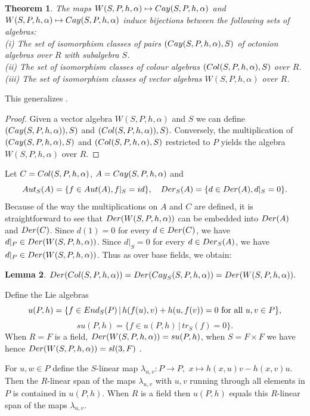 \documentclass[10pt]{amsart}
\theoremstyle{plain}
\newtheorem{theorem}{Theorem}[section]
\newtheorem{lemma}[theorem]{Lemma}
\theoremstyle{definition}
\begin{document}
\begin{theorem}
The maps $W(S, P, h,\alpha)\mapsto {\rm Cay}(S, P, h,\alpha)$ and $W(S, P, h,\alpha)\mapsto {\rm Cay}(S, P, h,\alpha)$ induce bijections between the following sets of algebras:
\\ (i) The set of isomorphism classes of pairs $({\rm Cay}(S, P, h,\alpha), S)$ of octonion algebras over $R$ with subalgebra $S$.
\\ (ii)  The set of isomorphism classes of colour algebras $({\rm Col}(S, P, h,\alpha), S)$ over $R$.
\\ (iii)  The set of isomorphism classes  of vector algebras $W(S, P, h,\alpha)$ over $R$.
\end{theorem}

This generalizes \cite[Theorem 3.1]{EM}.

\begin{proof}
Given a vector algebra $W(S, P, h,\alpha)$ and $S$ we can define $({\rm Cay}(S, P, h,\alpha)), S)$ and $({\rm Col}(S, P, h,\alpha)), S)$.
Conversely, the multiplication of  $({\rm Cay}(S, P, h,\alpha), S)$ and $({\rm Col}(S, P, h,\alpha), S)$ restricted to $P$ yields the algebra
$W(S, P, h,\alpha)$ over $R$.
\end{proof}


Let $C={\rm Col}(S, P,h,\alpha)$, $A={\rm Cay}(S, P,h,\alpha)$ and
$${\rm Aut}_S(A)=\{ f\in {\rm Aut}(A), f|_S=id \},\quad {\rm Der}_S(A)=\{  d\in {\rm Der}(A), d|_S=0\}.$$
Because of the way the multiplications on $A$ and $C$ are defined, it is straightforward to see that  ${\rm Der}(W(S, P,h,\alpha))$ can be embedded into  ${\rm Der}(A)$ and  ${\rm Der}(C)$. Since $d(1)=0$ for every $d\in {\rm Der}(C)$, we have $d|_P\in {\rm Der}(W(S, P,h,\alpha))$. Since
 $d|_S=0$ for every $d\in {\rm Der}_S(A)$, we have $d|_P\in {\rm Der}(W(S, P,h,\alpha))$.
 Thus as over base fields, we obtain:

 \begin{lemma}
 ${\rm Der}({\rm Col}(S, P,h,\alpha))={\rm Der}({\rm Cay}_S(S, P,h,\alpha))={\rm Der}(W(S, P,h,\alpha)).$
 \end{lemma}

 Define the Lie algebras
 $$u(P,h)=\{f\in {\rm End}_S(P)\,|\, h(f(u),v)+h(u,f(v))=0 \text{ for all }u,v\in P\},$$
 $$su(P,h)=\{f\in u(P,h)\,|\, tr_S(f)=0\}.$$
  When $R=F$
  is a field, ${\rm Der}(W(S, P,h,\alpha))=su(P,h)$, when $S=F\times F$ we have hence
 ${\rm Der}(W(S, P,h,\alpha))=sl(3,F)$ \cite[Theorem 3.4]{EM}.

 For $u,w\in P$ define the $S$-linear map $\lambda_{u,v}:P\rightarrow P,$ $x\mapsto h(x,u)v-h(x,v)u.$  Then the $R$-linear span of the maps $\lambda_{u,v}$ with $u,v$ running through all elements in $P$ is contained in $u(P,h)$. When $R$ is a field then $u(P,h)$ equals this $R$-linear span of the maps $\lambda_{u,v}$.
\end{document}
